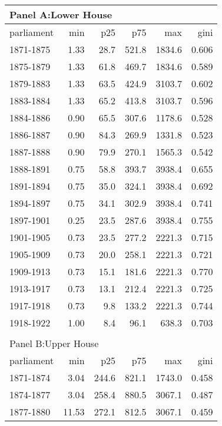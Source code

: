 \begin{table}[ht]
\centering
\begin{tabular}{lrrrrr}
   
\multicolumn{6}{l}{Panel A:Lower House}\\ 
\hline
parliament & min & p25 & p75 & max & gini \\\hline

1871-1875 & 1.33 & 28.7 & 521.8 & 1834.6 & 0.606 \\ 
  1875-1879 & 1.33 & 61.8 & 469.7 & 1834.6 & 0.589 \\ 
  1879-1883 & 1.33 & 63.5 & 424.9 & 3103.7 & 0.602 \\ 
  1883-1884 & 1.33 & 65.2 & 413.8 & 3103.7 & 0.596 \\ 
  1884-1886 & 0.90 & 65.5 & 307.6 & 1178.6 & 0.528 \\ 
  1886-1887 & 0.90 & 84.3 & 269.9 & 1331.8 & 0.523 \\ 
  1887-1888 & 0.90 & 79.9 & 270.1 & 1565.3 & 0.542 \\ 
  1888-1891 & 0.75 & 58.8 & 393.7 & 3938.4 & 0.655 \\ 
  1891-1894 & 0.75 & 35.0 & 324.1 & 3938.4 & 0.692 \\ 
  1894-1897 & 0.75 & 34.1 & 302.9 & 3938.4 & 0.741 \\ 
  1897-1901 & 0.25 & 23.5 & 287.6 & 3938.4 & 0.755 \\ 
  1901-1905 & 0.73 & 23.5 & 277.2 & 2221.3 & 0.715 \\ 
  1905-1909 & 0.73 & 20.0 & 258.1 & 2221.3 & 0.721 \\ 
  1909-1913 & 0.73 & 15.1 & 181.6 & 2221.3 & 0.770 \\ 
  1913-1917 & 0.73 & 13.1 & 212.4 & 2221.3 & 0.725 \\ 
  1917-1918 & 0.73 & 9.8 & 133.2 & 2221.3 & 0.744 \\ 
  1918-1922 & 1.00 & 8.4 & 96.1 & 638.3 & 0.703 \\ 
   \hline\\ 
\multicolumn{6}{l}{Panel B:Upper House}\\ 
\hline
parliament & min & p25 & p75 & max & gini \\\hline
1871-1874 & 3.04 & 244.6 & 821.1 & 1743.0 & 0.458 \\ 
  1874-1877 & 3.04 & 258.4 & 880.5 & 3067.1 & 0.487 \\ 
  1877-1880 & 11.53 & 272.1 & 812.5 & 3067.1 & 0.459 \\ 

\end{tabular}
\end{table}
